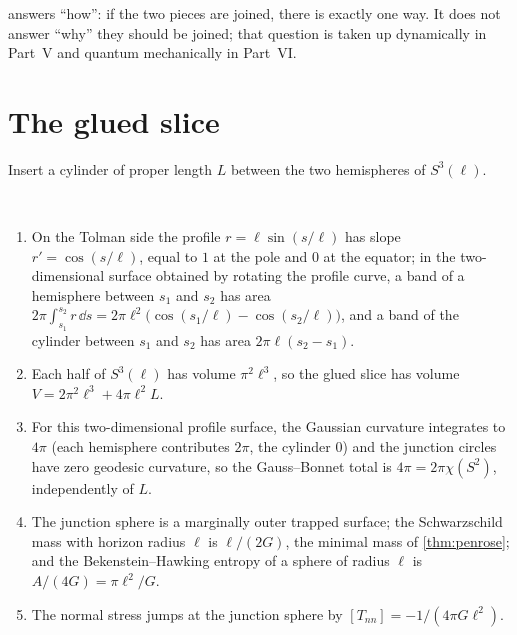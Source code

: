  answers ``how'': if the two pieces are joined, there is exactly one way. It does not answer ``why'' they should be joined; that question is taken up dynamically in Part~V and quantum mechanically in Part~VI.

\section{The glued slice}

Insert a cylinder of proper length $L$ between the two hemispheres of $S^3(\ell)$.

\begin{proposition}\label{prop:gluedslice}\ver\
\begin{enumerate}[label=(\roman*)]
\item On the Tolman side the profile $r=\ell\sin(s/\ell)$ has slope $r'=\cos(s/\ell)$, equal to $1$ at the pole and $0$ at the equator; in the two-dimensional surface obtained by rotating the profile curve, a band of a hemisphere between $s_1$ and $s_2$ has area $2\pi\int_{s_1}^{s_2}r\,\dd s=2\pi\ell^2\bigl(\cos(s_1/\ell)-\cos(s_2/\ell)\bigr)$, and a band of the cylinder between $s_1$ and $s_2$ has area $2\pi\ell(s_2-s_1)$.
\item Each half of $S^3(\ell)$ has volume $\pi^2\ell^3$, so the glued slice has volume $V=2\pi^2\ell^3+4\pi\ell^2L$.
\item For this two-dimensional profile surface, the Gaussian curvature integrates to $4\pi$ (each hemisphere contributes $2\pi$, the cylinder $0$) and the junction circles have zero geodesic curvature, so the Gauss--Bonnet total is $4\pi=2\pi\chi(S^2)$, independently of $L$.
\item The junction sphere is a marginally outer trapped surface; the Schwarzschild mass with horizon radius $\ell$ is $\ell/(2G)$, the minimal mass of \cref{thm:penrose}; and the Bekenstein--Hawking entropy of a sphere of radius $\ell$ is $A/(4G)=\pi\ell^2/G$.
\item The normal stress jumps at the junction sphere by $[T_{nn}]=-1/(4\pi G\ell^2)$.
\end{enumerate}
\end{proposition}
